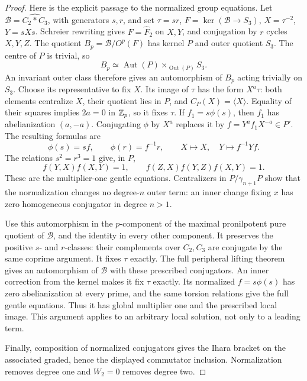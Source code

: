 \begin{proof}
Here is the explicit passage to the normalized group equations.
Let $\mathcal B=\widehat{C_2*C_3}$, with generators $s,r$, and set
$\tau=sr$, $F=\ker(\mathcal B\to S_3)$,
$X=\tau^{-2}$, $Y=sXs$.  Schreier rewriting gives $F=\widehat F_2$
on $X,Y$, and conjugation by $r$ cycles $X,Y,Z$.  The quotient
$B_p=\mathcal B/O^p(F)$ has kernel $P$ and outer quotient $S_3$.
The centre of $P$ is trivial, so
\[
 B_p\simeq\operatorname{Aut}(P)
           \mathbin{\times}_{\operatorname{Out}(P)} S_3.
\]
An invariant outer class therefore gives an automorphism of $B_p$
acting trivially on $S_3$.  Choose its representative to fix $X$.
Its image of $\tau$ has the form $X^a\tau$: both elements centralize
$X$, their quotient lies in $P$, and $C_P(X)=\langle X\rangle$.
Equality of their squares implies $2a=0$ in $\mathbb Z_p$, so it fixes $\tau$.
If $f_1=s\phi(s)$, then $f_1$ has abelianization $(a,-a)$.
Conjugating $\phi$ by $X^a$ replaces it by
$f=Y^af_1X^{-a}\in P'$.  The resulting formulas are
\[
 \phi(s)=sf,\qquad \phi(r)=f^{-1}r,
 \qquad X\mapsto X,\quad Y\mapsto f^{-1}Yf.
\]
The relations $s^2=r^3=1$ give, in $P$,
\[
 f(Y,X)f(X,Y)=1,\qquad f(Z,X)f(Y,Z)f(X,Y)=1.
\]
These are the multiplier-one gentle equations.  Centralizers in
$P/\gamma_{n+1}P$ show that the normalization changes no degree-$n$
outer term: an inner change fixing $x$ has zero homogeneous
conjugator in degree $n>1$.

Use this automorphism in the $p$-component of the maximal pronilpotent
pure quotient of $\mathcal B$, and the identity in every other component.
It preserves the positive $s$- and $r$-classes: their complements over
$C_2,C_3$ are conjugate by the same coprime argument.  It fixes $\tau$
exactly.  The full peripheral lifting theorem gives an automorphism
of $\mathcal B$ with these prescribed conjugators.  An inner correction
from the kernel makes it fix $\tau$ exactly.  Its normalized $f=s\phi(s)$
has zero abelianization at every prime, and the same torsion relations
give the full gentle equations.  Thus it has global multiplier one and
the prescribed local image.  This argument applies to an arbitrary
local solution, not only to a leading term.

Finally, composition of normalized conjugators gives the Ihara bracket
on the associated graded, hence the displayed commutator inclusion.
Normalization removes degree one and $W_2=0$ removes degree two.
\end{proof}

